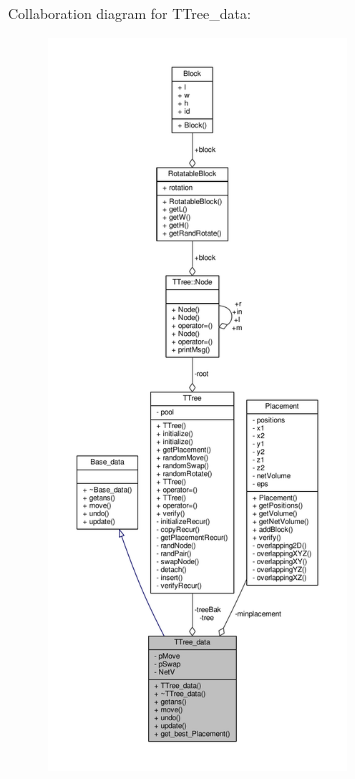 Collaboration diagram for T\+Tree\+\_\+data\+:
\nopagebreak
\begin{figure}[H]
\begin{center}
\leavevmode
\includegraphics[height=550pt]{classTTree__data__coll__graph}
\end{center}
\end{figure}
